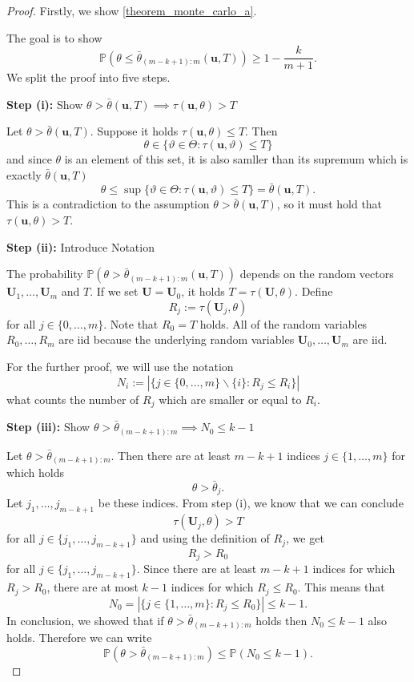 \begin{proof}%
	Firstly, we show \ref{theorem_monte_carlo_a}.
	
	The goal is to show 
	\[
		\mathbb{P} \left( \theta \leq \bar \theta_{(m-k+1):m} (\mathbf u, T) \right) \geq 1 - \frac{k}{m+1}.
	\]
	We split the proof into five steps.
	
	\textbf{Step (i):} Show $\theta > \bar \theta (\mathbf u, T) \implies \tau(\mathbf u, \theta) > T$
	
	Let $\theta > \bar \theta (\mathbf u, T)$. 
	Suppose it holds 
	$\tau(\mathbf u, \theta) \leq T$. Then 
	\[
		\theta \in \{ \vartheta \in \Theta : \tau (\mathbf u, \vartheta) \leq T \}
	\]
	and since $\theta$ is an element of this set, it is also samller than its supremum which is exactly $\bar \theta (\mathbf u, T)$
	\[
		\theta
		\leq
		\sup \{ \vartheta \in \Theta : \tau (\mathbf u, \vartheta) \leq T \} = \bar \theta (\mathbf u, T).
	\]
	This is a contradiction to the assumption $\theta > \bar \theta (\mathbf u, T)$, so it must hold that $\tau(\mathbf u, \theta) > T$.
	
	\textbf{Step (ii):} Introduce Notation
	
	The probability $\mathbb{P} \left( \theta > \bar \theta_{(m-k+1):m} (\mathbf u, T) \right)$ depends on the random vectors $\mathbf U_1, \ldots , \mathbf U_m$ and $T$. If we set $\mathbf U = \mathbf U_0$, it holds 
	$T = \tau (\mathbf U, \theta)$. Define 
	\[
		R_j := \tau (\mathbf U_j, \theta)
	\] 
	for all $j \in \{0, \ldots , m\}$. Note that $R_0 = T$ holds. All of the random variables $R_0, \ldots , R_m$ are iid because the underlying random variables $\mathbf U_0, \ldots , \mathbf U_m$ are iid.
	
	For the further proof, we will use the notation
	\[
		N_i := \left| \{ j \in \{0, \ldots , m\} \backslash \{i\}  : R_j \leq R_i \} \right|
	\]
	what counts the number of $R_j$ which are smaller or equal to $R_i$.
	
	\textbf{Step (iii):} Show $\theta > \bar \theta _{(m-k+1):m} \implies N_0 \leq k-1$
	
	Let $\theta > \bar \theta _{(m-k+1):m}$. Then there are at least $m-k+1$ indices $j \in \{1, \ldots , m\}$ for which holds
	\[
		\theta > \bar \theta_j.
	\]
	Let $j_1, \ldots , j_{m-k+1}$ be these indices. From step (i), we know that we can conclude
	\[
		\tau (\mathbf U_j, \theta) > T
	\]
	for all $j \in \{j_1, \ldots , j_{m-k+1}\}$ and using the definition of $R_j$, we get
	\[
		R_j > R_0
	\]
	for all $j \in \{j_1, \ldots , j_{m-k+1}\}$. Since there are at least $m-k+1$ indices for which $R_j > R_0$, there are at most $k-1$ indices for which $R_j \leq R_0$. 
	This means that 
	\[
		N_0 
		=
		\left| \{ j \in \{1, \ldots , m\}   : R_j \leq R_0 \} \right| 
		\leq k-1.
	\]
	In conclusion, we showed that if $\theta > \bar \theta _{(m-k+1):m}$ holds then $N_0 \leq k-1$ also holds. Therefore we can write 
	\begin{equation} \label{rank proof uff 3}
		\mathbb{P} \left(\theta > \bar \theta _{(m-k+1):m}  \right)
			\leq 
		\mathbb{P} \left(N_0 \leq k-1  \right).
	\end{equation}
	

\end{proof}
